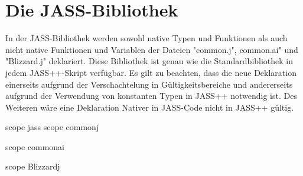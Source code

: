 \chapter{Die JASS-Bibliothek}
In der JASS-Bibliothek werden sowohl native Typen und Funktionen als auch nicht native Funktionen und Variablen der Dateien
"common.j", common.ai" und "Blizzard.j" deklariert.
Diese Bibliothek ist genau wie die Standardbibliothek in jedem JASS++-Skript verfügbar.
Es gilt zu beachten, dass die neue Deklaration einerseits aufgrund der Verschachtelung in Gültigkeitsbereiche und andererseits
aufgrund der Verwendung von konstanten Typen in JASS++ notwendig ist.
Des Weiteren wäre eine Deklaration Nativer in JASS-Code nicht in JASS++ gültig.

scope jass
	scope commonj

	scope commonai

	scope Blizzardj